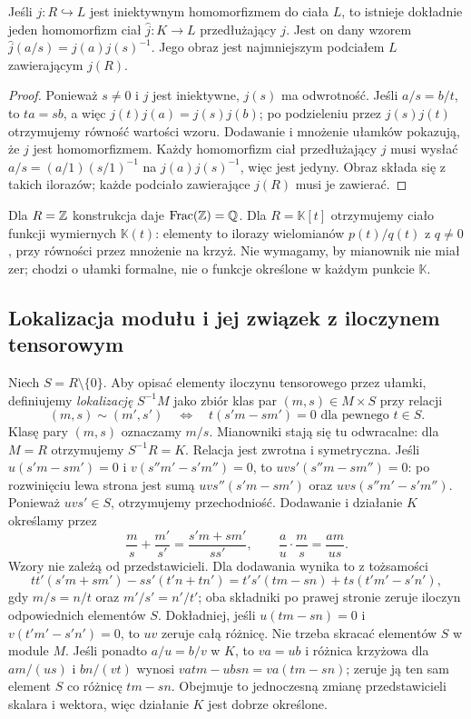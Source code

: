 \begin{stwierdzenie}
Jeśli $j:R\hookrightarrow L$ jest iniektywnym homomorfizmem
do ciała $L$, to istnieje dokładnie jeden homomorfizm ciał
$\widehat j:K\to L$ przedłużający $j$. Jest on dany wzorem
$\widehat j(a/s)=j(a)j(s)^{-1}$.
Jego obraz jest najmniejszym podciałem $L$ zawierającym $j(R)$.
\end{stwierdzenie}
\begin{proof}
Ponieważ $s\ne0$ i $j$ jest iniektywne, $j(s)$ ma odwrotność.
Jeśli $a/s=b/t$, to $ta=sb$, a więc
$j(t)j(a)=j(s)j(b)$; po podzieleniu przez $j(s)j(t)$
otrzymujemy równość wartości wzoru. Dodawanie i mnożenie
ułamków pokazują, że $\widehat j$ jest homomorfizmem.
Każdy homomorfizm ciał przedłużający $j$ musi wysłać
$a/s=(a/1)(s/1)^{-1}$ na $j(a)j(s)^{-1}$,
więc jest jedyny. Obraz składa się z takich ilorazów;
każde podciało zawierające $j(R)$ musi je zawierać.
\end{proof}

\begin{przyklad}
Dla $R=\mathbb{Z}$ konstrukcja daje $\operatorname{Frac}(\mathbb{Z})=\mathbb{Q}$.
Dla $R=\mathbb K[t]$ otrzymujemy ciało funkcji wymiernych
$\mathbb K(t)$: elementy to ilorazy wielomianów $p(t)/q(t)$ z
$q\ne0$, przy równości przez mnożenie na krzyż. Nie wymagamy,
by mianownik nie miał zer; chodzi o ułamki formalne, nie o funkcje
określone w każdym punkcie $\mathbb K$.
\end{przyklad}

\subsection*{Lokalizacja modułu i jej związek z iloczynem tensorowym}

Niech $S=R\setminus\{0\}$. Aby opisać elementy iloczynu tensorowego przez
ułamki, definiujemy \emph{lokalizację} $S^{-1}M$ jako zbiór klas
par $(m,s)\in M\times S$ przy relacji
\[
(m,s)\sim(m',s')
\quad\Longleftrightarrow\quad
t(s'm-sm')=0\text{ dla pewnego }t\in S.
\]
Klasę pary $(m,s)$ oznaczamy $m/s$. Mianowniki stają się tu
odwracalne: dla $M=R$ otrzymujemy $S^{-1}R=K$.
Relacja jest zwrotna i symetryczna. Jeśli
$u(s'm-sm')=0$ i $v(s''m'-s'm'')=0$, to
$uvs'(s''m-sm'')=0$: po rozwinięciu lewa strona
jest sumą $uvs''(s'm-sm')$ oraz
$uvs(s''m'-s'm'')$. Ponieważ $uvs'\in S$,
otrzymujemy przechodniość.
Dodawanie i działanie $K$ określamy przez
\[
\frac{m}{s}+\frac{m'}{s'}=\frac{s'm+sm'}{ss'},
\qquad
\frac{a}{u}\cdot\frac{m}{s}=\frac{am}{us}.
\]
Wzory nie zależą od przedstawicieli. Dla dodawania wynika to
z tożsamości
\[
tt'(s'm+sm')-ss'(t'n+tn')
=t's'(tm-sn)+ts(t'm'-s'n'),
\]
gdy $m/s=n/t$ oraz $m'/s'=n'/t'$; oba składniki po prawej
stronie zeruje iloczyn odpowiednich elementów $S$.
Dokładniej, jeśli $u(tm-sn)=0$ i $v(t'm'-s'n')=0$,
to $uv$ zeruje całą różnicę. Nie trzeba skracać elementów
$S$ w module $M$.
Jeśli ponadto $a/u=b/v$ w $K$, to $va=ub$ i różnica
krzyżowa dla $am/(us)$ i $bn/(vt)$ wynosi
$v a t m-u b s n=v a(t m-s n)$; zeruje ją ten sam element $S$
co różnicę $t m-s n$. Obejmuje to jednoczesną zmianę
przedstawicieli skalara i wektora, więc działanie $K$
jest dobrze określone.

